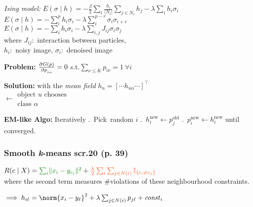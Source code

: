 \emph{Ising model:}\enskip
$E(\sigma\mid h) = -\frac{\beta}{2} \sum_i \frac{h_i}{|N_i|} \sum_{j \in N_i} h_j - \lambda \sum_i h_i \sigma_i$\\
$E(\sigma\mid h) = - \sum_i^p h_i \sigma_i  -\lambda\sum_i^{p-r}\sigma_i\sigma_{i+r} $\\
$E(\sigma\mid h) =  - \sum_i h_i \sigma_i - \lambda\sum_{i,j} J_{ij} \sigma_i \sigma_j$
\\
where $J_{ij}$:\, interaction between particles,\\\phantom{where}
$h_i$:\, noisy image,\enskip
$\sigma_i$:\, denoised image

\textbf{Problem:} \quad $\pderiv{G(p)}{p_{i\alpha}} = 0$ \enspace s.t.\enspace $\sum_{\nu\leq K} p_{i\nu} = 1 \: \forall i$

\textbf{Solution:}\quad
with the \textit{mean field} $h_u = [\cdots h_{u\alpha} \cdots]^\top$
\\
 $\leftarrow \substack{\text{object }u\text{ chooses}\\\text{class } \alpha}$
\\

\textbf{EM-like Algo:}\enspace
Iteratively .~Pick~random $i$ .~$h_i^{\mathrm{new}} {\leftarrow} p_j^{\mathrm{old}}$ .~$p_i^{\mathrm{new}} {\leftarrow} h_i^{\mathrm{new}}$ \enspace
until converged.

\subsubsection{Smooth \textit{\rmfamily k}-means
\qquad\normalfont\sffamily\color{gray}scr.20 (p. 39)}

$R(c\mid X) =
{\color{Green} \sum_i \lVert x_i - y_{c_i} \rVert^2}
+
{\color{OrangeRed} \frac\lambda2 \sum_i \sum_{j\in N(i)} \mathbb I_{\{c_i \neq c_j\}}}$
\\
where the second term measures {\color{OrangeRed} \#violations} of these neighbourhood constraints.

$\implies h_{i\ell} = \norm{x_i - y_\ell}^2 + \lambda \sum_{j\in N(i)} p_{j\ell} + \mathit{const}_i$

